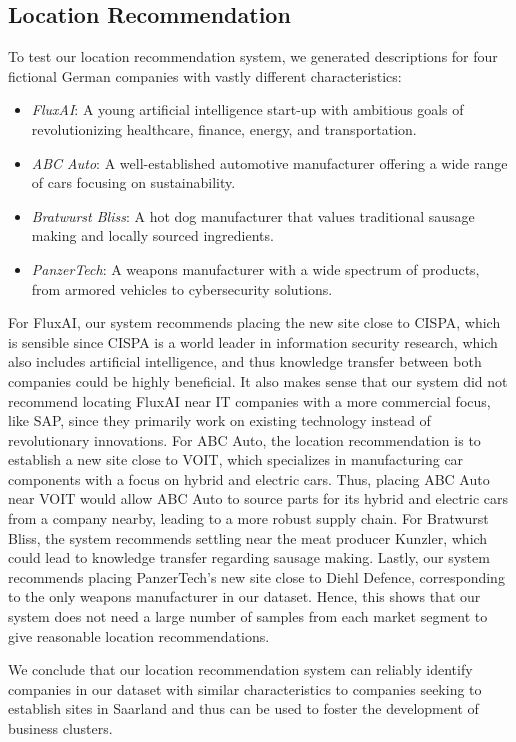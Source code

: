 \documentclass[conference]{IEEEtran}
\begin{document}
\subsection{Location Recommendation}
To test our location recommendation system, we generated descriptions for four fictional German companies with vastly different characteristics:
\begin{itemize}
    \item \textit{FluxAI}: A young artificial intelligence start-up with ambitious goals of revolutionizing healthcare, finance, energy, and transportation.
    \item \textit{ABC Auto}: A well-established automotive manufacturer offering a wide range of cars focusing on sustainability.
    \item \textit{Bratwurst Bliss}: A hot dog manufacturer that values traditional sausage making and locally sourced ingredients.
    \item \textit{PanzerTech}: A weapons manufacturer with a wide spectrum of products, from armored vehicles to cybersecurity solutions.
\end{itemize}

For FluxAI, our system recommends placing the new site close to CISPA, which is sensible since CISPA is a world leader in information security research, which also includes artificial intelligence, and thus knowledge transfer between both companies could be highly beneficial. It also makes sense that our system did not recommend locating FluxAI near IT companies with a more commercial focus, like SAP, since they primarily work on existing technology instead of revolutionary innovations.
For ABC Auto, the location recommendation is to establish a new site close to VOIT, which specializes in manufacturing car components with a focus on hybrid and electric cars. Thus, placing ABC Auto near VOIT would allow ABC Auto to source parts for its hybrid and electric cars from a company nearby, leading to a more robust supply chain.
For Bratwurst Bliss, the system recommends settling near the meat producer Kunzler, which could lead to knowledge transfer regarding sausage making.
Lastly, our system recommends placing PanzerTech's new site close to Diehl Defence, corresponding to the only weapons manufacturer in our dataset. Hence, this shows that our system does not need a large number of samples from each market segment to give reasonable location recommendations.

We conclude that our location recommendation system can reliably identify companies in our dataset with similar characteristics to companies seeking to establish sites in Saarland and thus can be used to foster the development of business clusters.
\end{document}
